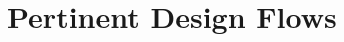 \documentclass[conference, 9pt]{IEEEtran}
\begin{document}
% 
% 



\section{Pertinent Design Flows}
\end{document}
